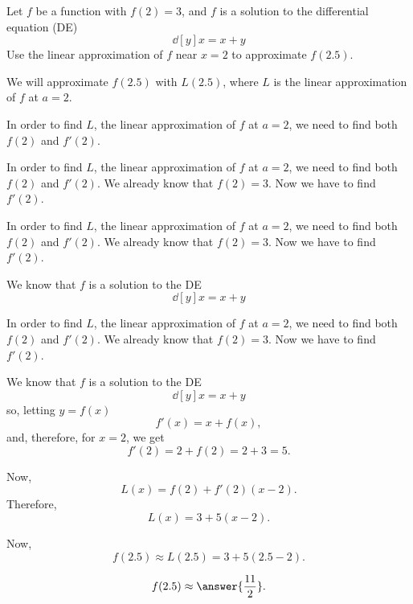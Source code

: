 \documentclass{ximera}
\author{Steven Gubkin\and Nela Lakos}
\begin{document}
\begin{exercise}

Let $f$ be a function with $f(2) = 3$, and $f$ is a solution to the
differential equation (DE)
\[
\dd[y]{x} = x+y
\]
Use the linear approximation of $f$ near $x=2$ to approximate $f(2.5)$. 
\begin{hint}
We will approximate $f(2.5)$ with $L(2.5)$, where $L$ is the linear approximation of $f$ at $a=2$.
\end{hint}
\begin{hint}
In order to find $L$, the linear approximation of $f$ at $a=2$, we need to find both $f(2)$ and $f'(2)$.
\end{hint}
\begin{hint}
In order to find $L$, the linear approximation of $f$ at $a=2$, we need to find both $f(2)$ and $f'(2)$.
We already know that $f(2)=3$. Now we have to find $f'(2)$.
\end{hint}
\begin{hint}
In order to find $L$, the linear approximation of $f$ at $a=2$, we need to find both $f(2)$ and $f'(2)$.
We already know that $f(2)=3$. Now we have to find $f'(2)$.

We know that $f$ is a solution to the DE
\[
\dd[y]{x} = x+y
\]
\end{hint}

\begin{hint}
In order to find $L$, the linear approximation of $f$ at $a=2$, we need to find both $f(2)$ and $f'(2)$.
We already know that $f(2)=3$. Now we have to find $f'(2)$.

We know that $f$ is a solution to the DE
\[
\dd[y]{x} = x+y
\]
so, letting $y=f(x)$
\[
f'(x)= x+f(x),
\]
and, therefore, for $x=2$, we get
\[
f'(2)= 2+f(2)=2+3=5.
\]
\end{hint}
\begin{hint}
Now, 
\[
L(x)=f(2)+f'(2)(x-2).
\]
Therefore,
\[
L(x)=3+5(x-2).
\]
\end{hint}
\begin{hint}
Now, 
\[
f(2.5)\approx L(2.5)=3+5(2.5-2).
\]
\end{hint}
\[
f(2.5)\approx \answer{\frac{11}{2}}.
\]
\end{exercise}
\end{document}
